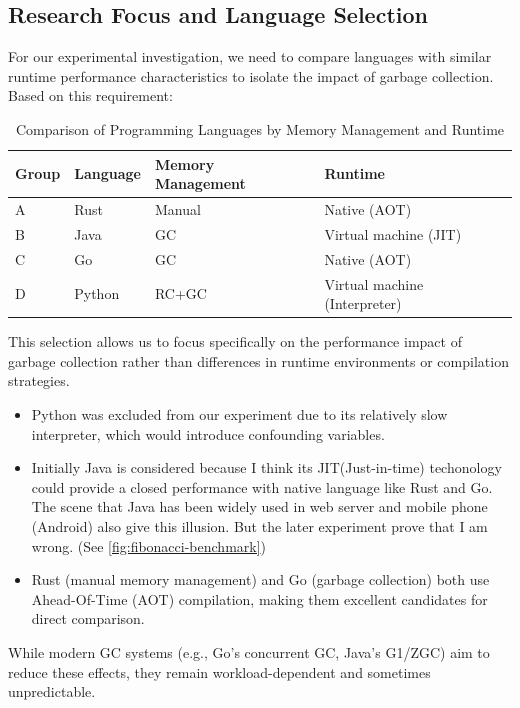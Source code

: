 \subsection{Research Focus and Language Selection}

For our experimental investigation, we need to compare languages with similar runtime performance characteristics to isolate the impact of garbage collection. Based on this requirement:

\begin{table}[h]
  \centering
  \begin{tabular}{@{}llll@{}}
  \toprule
  Group & Language & Memory Management & Runtime \\
  \midrule
  A & Rust & Manual & Native (AOT) \\
  B & Java & GC & Virtual machine (JIT) \\
  C & Go & GC & Native (AOT) \\
  D & Python & RC+GC & Virtual machine (Interpreter) \\
  \bottomrule
  \end{tabular}
  \caption{Comparison of Programming Languages by Memory Management and Runtime }
  \end{table}

This selection allows us to focus specifically on the performance impact of garbage collection rather than differences in runtime environments or compilation strategies.


\begin{itemize}
    \item Python was excluded from our experiment due to its relatively slow interpreter, which would introduce confounding variables.
    \item Initially Java is considered because I think its JIT(Just-in-time) techonology could provide a closed performance with native language like Rust and Go. The scene that Java has been widely used in web server and mobile phone (Android) also give this illusion. But the later experiment prove that I am wrong. (See \ref{fig:fibonacci-benchmark})  
    \item Rust (manual memory management) and Go (garbage collection) both use Ahead-Of-Time (AOT) compilation, making them excellent candidates for direct comparison.
\end{itemize}

While modern GC systems (e.g., Go's concurrent GC, Java's G1/ZGC) aim to reduce these effects, they remain workload-dependent and sometimes unpredictable.

